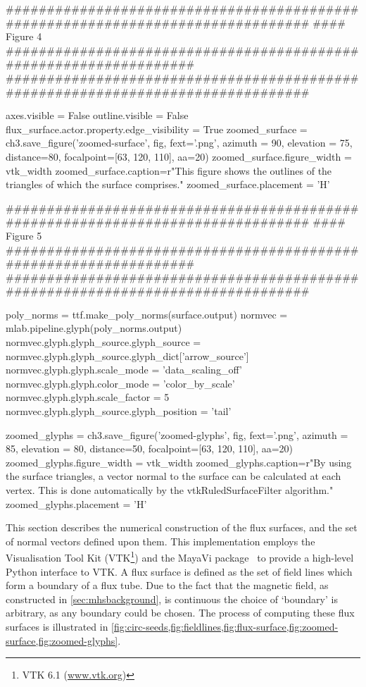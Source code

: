 \begin{pycode}[chapter3a]
################################################################################
#### Figure 4 ##################################################################
################################################################################

axes.visible = False
outline.visible = False
flux_surface.actor.property.edge_visibility = True
zoomed_surface = ch3.save_figure('zoomed-surface', fig, fext='.png', azimuth = 90, elevation = 75, distance=80, focalpoint=[63, 120, 110], aa=20)
zoomed_surface.figure_width = vtk_width
zoomed_surface.caption=r"This figure shows the outlines of the triangles of which the surface comprises."
zoomed_surface.placement = 'H'

################################################################################
#### Figure 5 ##################################################################
################################################################################

poly_norms = ttf.make_poly_norms(surface.output)
normvec = mlab.pipeline.glyph(poly_norms.output)
normvec.glyph.glyph_source.glyph_source = normvec.glyph.glyph_source.glyph_dict['arrow_source']
normvec.glyph.glyph.scale_mode = 'data_scaling_off'
normvec.glyph.glyph.color_mode = 'color_by_scale'
normvec.glyph.glyph.scale_factor = 5
normvec.glyph.glyph_source.glyph_position = 'tail'

zoomed_glyphs = ch3.save_figure('zoomed-glyphs', fig, fext='.png', azimuth = 85, elevation = 80, distance=50, focalpoint=[63, 120, 110], aa=20)
zoomed_glyphs.figure_width = vtk_width
zoomed_glyphs.caption=r"By using the surface triangles, a vector normal to the surface can be calculated at each vertex. This is done automatically by the vtkRuledSurfaceFilter algorithm."
zoomed_glyphs.placement = 'H'
\end{pycode}

This section describes the numerical construction of the flux surfaces, and the set of normal vectors defined upon them.
This implementation employs the Visualisation Tool Kit (VTK\footnote{VTK 6.1 (\url{www.vtk.org})}) and the MayaVi package~\citep{ramachandran2011} to provide a high-level Python interface to VTK.
A flux surface is defined as the set of field lines which form a boundary of a flux tube.
Due to the fact that the magnetic field, as constructed in \cref{sec:mhsbackground}, is continuous the choice of `boundary' is arbitrary, as any boundary could be chosen.
The process of computing these flux surfaces is illustrated in \cref{fig:circ-seeds,fig:fieldlines,fig:flux-surface,fig:zoomed-surface,fig:zoomed-glyphs}.

